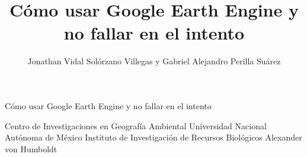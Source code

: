 \documentclass[
  12pt,
  letterpaper,
  twoside]{book}
\title{Cómo usar Google Earth Engine y no fallar en el intento}
\author{Jonathan Vidal Solórzano Villegas y Gabriel Alejandro Perilla Suárez}
\date{}
\begin{document}
\maketitle

\thispagestyle{empty}
\begin{center}

\end{center}

\newpage
{}
\vspace*{\fill}
\begin{center}
\LARGE{Cómo usar Google Earth Engine y no fallar en el intento}
\end{center}
\vspace*{\fill}

\newpage

\vspace*{\fill}
\begin{center}
\large{Centro de Investigaciones en Geografía Ambiental}
\linebreak
\large{Universidad Nacional Autónoma de México}
\linebreak
\large{Instituto de Investigación de Recursos Biológicos Alexander von Humboldt}
\end{center}
\vspace*{\fill}

\newpage
\end{document}
